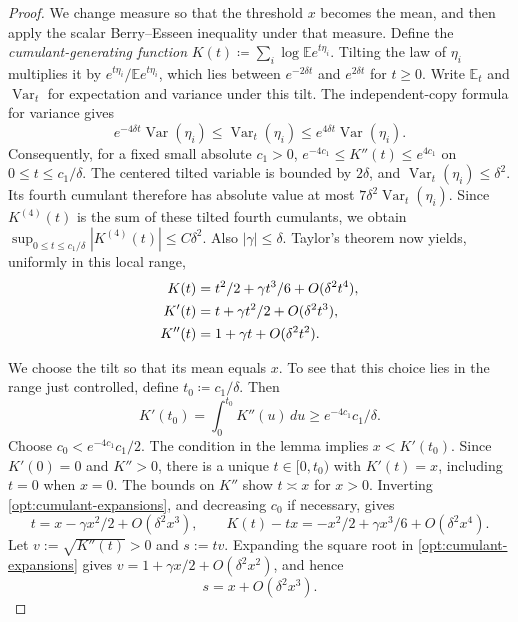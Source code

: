 \documentclass[11pt,letterpaper]{article}
\theoremstyle{remark}
\newcommand{\E}{\mathbb E}
\newcommand{\Var}{\operatorname{Var}}
\begin{document}
\begin{proof}
We change measure so that the threshold \(x\) becomes the mean, and
then apply the scalar Berry--Esseen inequality under that measure.
Define the \emph{cumulant-generating function}
\(K(t)\coloneqq\sum_i\log\E e^{t\eta_i}\). Tilting the law of
\(\eta_i\) multiplies it by \(e^{t\eta_i}/\E e^{t\eta_i}\), which
lies between \(e^{-2\delta t}\) and \(e^{2\delta t}\) for \(t\ge0\).
Write \(\E_t\) and \(\Var_t\) for expectation and variance
under this tilt. The independent-copy formula for variance gives
\[
 e^{-4\delta t}\Var(\eta_i)
 \le\Var_t(\eta_i)\le e^{4\delta t}\Var(\eta_i).
\]
Consequently, for a fixed small absolute \({c_1}>0\),
\(e^{-4{c_1}}\le K''(t)\le e^{4{c_1}}\) on
\(0\le t\le {c_1}/\delta\). The centered tilted variable is bounded by
\(2\delta\), and \(\Var_t(\eta_i)\le\delta^2\). Its fourth cumulant
therefore has absolute value at most
\(7\delta^2\Var_t(\eta_i)\). Since \(K^{(4)}(t)\) is the sum of
these tilted fourth cumulants, we obtain
\(\sup_{0\le t\le {c_1}/\delta}|K^{(4)}(t)|\le C\delta^2\).
Also \(|\gamma|\le\delta\). Taylor's theorem now yields, uniformly in
this local range,
\begin{align}
 K(t)&=t^2/2+\gamma t^3/6+O(\delta^2t^4),\notag\\
 K'(t)&=t+\gamma t^2/2+O(\delta^2t^3),\notag\\
 K''(t)&=1+\gamma t+O(\delta^2t^2).
 \label{opt:cumulant-expansions}
\end{align}

We choose the tilt so that its mean equals \(x\). To see that this
choice lies in the range just controlled, {define} \(t_0\coloneqq {c_1}/\delta\).
Then
\[
 K'(t_0)=\int_0^{t_0}K''(u)\,du
 \ge e^{-4{c_1}}{c_1}/\delta.
\]
Choose \({c_0}<e^{-4{c_1}}{c_1}/2\). The condition in the lemma implies
\(x<K'(t_0)\). Since \(K'(0)=0\) and \(K''>0\), there is a unique
\(t\in[0,t_0)\) with \(K'(t)=x\), including \(t=0\) when \(x=0\).
The bounds on \(K''\) show \(t\asymp x\) for \(x>0\).
Inverting \eqref{opt:cumulant-expansions}, and decreasing \({c_0}\) if
necessary, gives
\begin{equation}
 t=x-\gamma x^2/2+O(\delta^2x^3),\qquad
 K(t)-tx=-x^2/2+\gamma x^3/6+O(\delta^2x^4).
 \label{opt:tilt-root}
\end{equation}
Let \(v:=\sqrt{K''(t)}>0\) and \(s:=tv\). Expanding the square root in
\eqref{opt:cumulant-expansions} gives
\(v=1+\gamma x/2+O(\delta^2x^2)\), and hence
\begin{equation}
 s=x+O(\delta^2x^3).
 \label{opt:tilted-scale}
\end{equation}


\end{proof}
\end{document}
